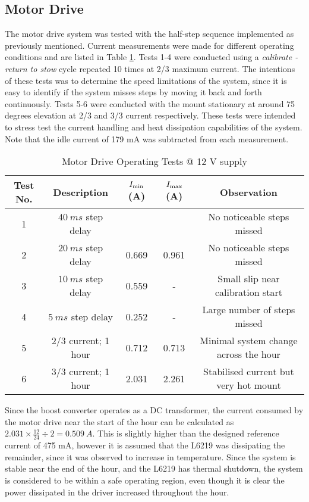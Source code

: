 \subsection{Motor Drive}
The motor drive system was tested with the half-step sequence implemented as previously mentioned. Current measurements were made for different operating conditions and are listed in Table \ref{tab:motorDriveTests}. Tests 1-4 were conducted using a \textit{calibrate - return to stow} cycle repeated 10 times at 2/3 maximum current. The intentions of these tests was to determine the speed limitations of the system, since it is easy to identify if the system misses steps by moving it back and forth continuously. Tests 5-6 were conducted with the mount stationary at around 75 degrees elevation at 2/3 and 3/3 current respectively. These tests were intended to stress test the current handling and heat dissipation capabilities of the system. Note that the idle current of 179 mA was subtracted from each measurement.

\begin{table}[!htb]
  \centering
  \renewcommand{\arraystretch}{1.2}
  \hspace*{-1cm}
  \begin{tabular}{ |c|c|c|c|c| }
  \hline
  \textbf{Test No.}  & \textbf{Description} & \textbf{$I_{\textnormal{min}}$ (A)}   & \textbf{$I_{\textnormal{max}}$ (A)}  & Observation \\
  \hline
  1
  & $\SI{40}{ms}$ step delay           
  & 
  & 
  & No noticeable steps missed
  \\  \hline
  2
  & $\SI{20}{ms}$ step delay           
  & 0.669
  & 0.961
  & No noticeable steps missed
  \\  \hline
  3
  & $\SI{10}{ms}$ step delay           
  & 0.559
  & -                   
  & Small slip near calibration start
  \\  \hline
  4
  & $\SI{5}{ms}$ step delay           
  & 0.252
  & -                   
  & Large number of steps missed
  \\  \hline
  5
  & 2/3 current; 1 hour
  & 0.712
  & 0.713
  & Minimal system change across the hour
  \\  \hline
  6
  & 3/3 current; 1 hour
  & 2.031
  & 2.261
  & Stabilised current but very hot mount
  \\  \hline
  \end{tabular}
  \caption{Motor Drive Operating Tests @ 12 V supply}
  \label{tab:motorDriveTests}
\end{table}

Since the boost converter operates as a DC transformer, the current consumed by the motor drive near the start of the hour can be calculated as $2.031 \times \frac{12}{24} \div 2 = \SI{0.509}{A}$. This is slightly higher than the designed reference current of 475 mA, however it is assumed that the L6219 was dissipating the remainder, since it was observed to increase in temperature. Since the system is stable near the end of the hour, and the L6219 has thermal shutdown, the system is considered to be within a safe operating region, even though it is clear the power dissipated in the driver increased throughout the hour.